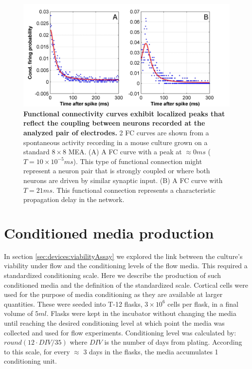 \begin{figure}[h]
\centering
\includegraphics[width=15cm]{chapter2/figures/FCDemonstration/FCDemonstration.jpg}
\caption[Examples of functional connectivity curves]{\textbf{Functional connectivity curves exhibit localized peaks that reflect the coupling between neurons recorded at the analyzed pair of electrodes.} 2 FC curves are shown from a spontaneous activity recording in a mouse culture grown on a standard \(8\times 8\) MEA. (A) A FC curve with a peak at \(\approx 0ms\) (\(T=10\times 10^{-5}ms\)). This type of functional connection might represent a neuron pair that is strongly coupled or where both neurons are driven by similar synaptic input. (B) A FC curve with \(T=21ms\). This functional connection represents a characteristic propagation delay in the network.}

\label{fig:methods:FC}
\end{figure}
\label{sec:methods:FC}

\section{Conditioned media production}
In section \ref{sec:devices:viabilityAssay} we explored the link between the culture's viability under flow and the conditioning levels of the flow media. This required a standardized conditioning scale. Here we describe the production of such conditioned media and the definition of the standardized scale. Cortical cells were used for the purpose of media conditioning as they are available at larger quantities. These were seeded into T-12 flasks, \(3\times 10^6\) cells per flask, in a final volume of \(5 ml\). Flasks were kept in the incubator without changing the media until reaching the desired conditioning level at which point the media was collected and used for flow experiments. Conditioning level was calculated by: \(round(12\cdot DIV / 35)\) where \(DIV\) is the number of days from plating. According to this scale, for every \(\approx\) 3 days in the flasks, the media accumulates 1 conditioning unit.
    \label{sec:methods:cond}



